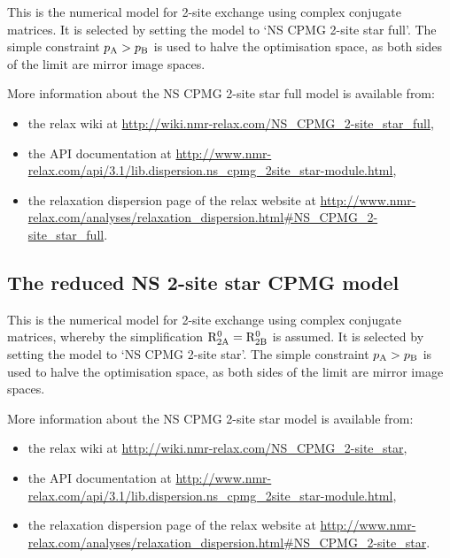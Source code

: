 This is the numerical model for 2-site exchange using complex conjugate matrices.
It is selected by setting the model to `NS CPMG 2-site star full'.
The simple constraint $p_\textrm{A} > p_\textrm{B}$ is used to halve the optimisation space, as both sides of the limit are mirror image spaces.

More information about the NS CPMG 2-site star full model is available from:
\begin{itemize}
  \item the relax wiki at \url{http://wiki.nmr-relax.com/NS\_CPMG\_2-site\_star\_full},
  \item the API documentation at \url{http://www.nmr-relax.com/api/3.1/lib.dispersion.ns\_cpmg\_2site\_star-module.html},
  \item the relaxation dispersion page of the relax website at \url{http://www.nmr-relax.com/analyses/relaxation\_dispersion.html#NS\_CPMG\_2-site\_star\_full}.
\end{itemize}



\subsection{The reduced NS 2-site star CPMG model}
\label{sect: dispersion: NS CPMG 2-site star model}

This is the numerical model for 2-site exchange using complex conjugate matrices, whereby the simplification $\mathrm{R}_\mathrm{2A}^0 = \mathrm{R}_\mathrm{2B}^0$ is assumed.
It is selected by setting the model to `NS CPMG 2-site star'.
The simple constraint $p_\textrm{A} > p_\textrm{B}$ is used to halve the optimisation space, as both sides of the limit are mirror image spaces.

More information about the NS CPMG 2-site star model is available from:
\begin{itemize}
  \item the relax wiki at \url{http://wiki.nmr-relax.com/NS\_CPMG\_2-site\_star},
  \item the API documentation at \url{http://www.nmr-relax.com/api/3.1/lib.dispersion.ns\_cpmg\_2site\_star-module.html},
  \item the relaxation dispersion page of the relax website at \url{http://www.nmr-relax.com/analyses/relaxation\_dispersion.html#NS\_CPMG\_2-site\_star}.
\end{itemize}



